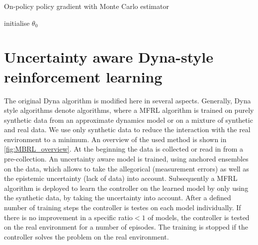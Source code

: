 \documentclass[
 reprint,
 amsmath,amssymb,amsfonts,clevref,
 aps,
prstab,
]{revtex4-2}
\begin{document}
\begin{algorithm}[ht]
\caption{On-policy policy gradient with Monte Carlo estimator \label{alg:pg}}
\begin{algorithmic}[1]
\State initialise $\theta_0$
\end{algorithmic}
\end{algorithm}

\section{Uncertainty aware Dyna-style reinforcement learning}
The original Dyna algorithm \cite{DYNA} is modified here in several aspects. Generally, Dyna style algorithms denote algorithms, where a MFRL algorithm is trained on purely synthetic data from an approximate dynamics model or on a mixture of synthetic and real data. We use only synthetic data to reduce the interaction with the real environment to a minimum.
An overview of the used method is shown in \cref{fig:MBRL_overview}. At the beginning the data is collected or read in from a pre-collection. An uncertainty aware model is trained, using anchored ensembles on the data, which allows to take the allegorical (measurement errors) as well as the epistemic uncertainty (lack of data) into account. Subsequently a MFRL algorithm is deployed to learn the controller on the learned model by only using the synthetic data, by taking the uncertainty into account. After a defined number of training steps the controller is testes on each model individually. If there is no improvement in a specific ratio$<1$ of models, the controller is tested on the real environment for a number of episodes. The training is stopped if the controller solves the problem on the real environment.
\end{document}
